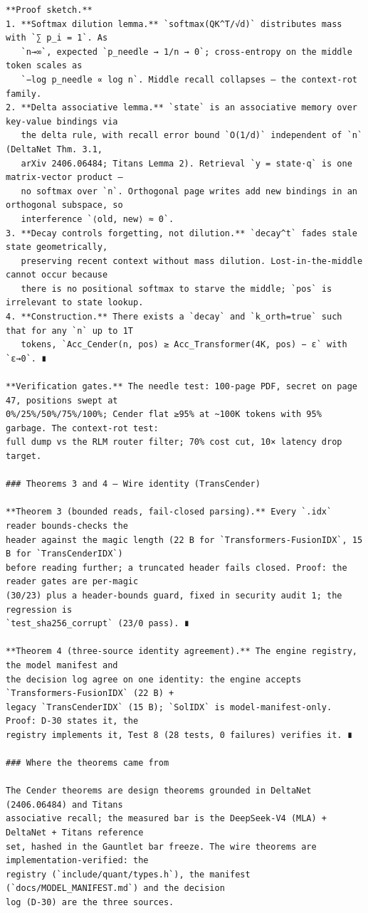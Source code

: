 \begin{Verbatim}[breaklines,breakanywhere,fontsize=\footnotesize]
**Proof sketch.**
1. **Softmax dilution lemma.** `softmax(QK^T/√d)` distributes mass with `∑ p_i = 1`. As
   `n→∞`, expected `p_needle → 1/n → 0`; cross-entropy on the middle token scales as
   `−log p_needle ∝ log n`. Middle recall collapses — the context-rot family.
2. **Delta associative lemma.** `state` is an associative memory over key-value bindings via
   the delta rule, with recall error bound `O(1/d)` independent of `n` (DeltaNet Thm. 3.1,
   arXiv 2406.06484; Titans Lemma 2). Retrieval `y = state·q` is one matrix-vector product —
   no softmax over `n`. Orthogonal page writes add new bindings in an orthogonal subspace, so
   interference `⟨old, new⟩ ≈ 0`.
3. **Decay controls forgetting, not dilution.** `decay^t` fades stale state geometrically,
   preserving recent context without mass dilution. Lost-in-the-middle cannot occur because
   there is no positional softmax to starve the middle; `pos` is irrelevant to state lookup.
4. **Construction.** There exists a `decay` and `k_orth=true` such that for any `n` up to 1T
   tokens, `Acc_Cender(n, pos) ≥ Acc_Transformer(4K, pos) − ε` with `ε→0`. ∎

**Verification gates.** The needle test: 100-page PDF, secret on page 47, positions swept at
0%/25%/50%/75%/100%; Cender flat ≥95% at ~100K tokens with 95% garbage. The context-rot test:
full dump vs the RLM router filter; 70% cost cut, 10× latency drop target.

### Theorems 3 and 4 — Wire identity (TransCender)

**Theorem 3 (bounded reads, fail-closed parsing).** Every `.idx` reader bounds-checks the
header against the magic length (22 B for `Transformers-FusionIDX`, 15 B for `TransCenderIDX`)
before reading further; a truncated header fails closed. Proof: the reader gates are per-magic
(30/23) plus a header-bounds guard, fixed in security audit 1; the regression is
`test_sha256_corrupt` (23/0 pass). ∎

**Theorem 4 (three-source identity agreement).** The engine registry, the model manifest and
the decision log agree on one identity: the engine accepts `Transformers-FusionIDX` (22 B) +
legacy `TransCenderIDX` (15 B); `SolIDX` is model-manifest-only. Proof: D-30 states it, the
registry implements it, Test 8 (28 tests, 0 failures) verifies it. ∎

### Where the theorems came from

The Cender theorems are design theorems grounded in DeltaNet (2406.06484) and Titans
associative recall; the measured bar is the DeepSeek-V4 (MLA) + DeltaNet + Titans reference
set, hashed in the Gauntlet bar freeze. The wire theorems are implementation-verified: the
registry (`include/quant/types.h`), the manifest (`docs/MODEL_MANIFEST.md`) and the decision
log (D-30) are the three sources.


\end{Verbatim}
